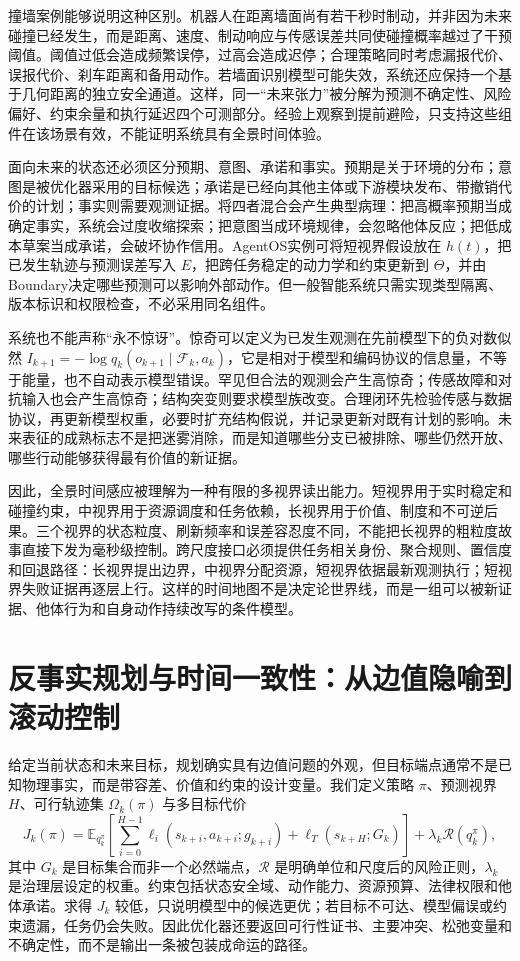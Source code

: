 撞墙案例能够说明这种区别。机器人在距离墙面尚有若干秒时制动，并非因为未来碰撞已经发生，而是距离、速度、制动响应与传感误差共同使碰撞概率越过了干预阈值。阈值过低会造成频繁误停，过高会造成迟停；合理策略同时考虑漏报代价、误报代价、刹车距离和备用动作。若墙面识别模型可能失效，系统还应保持一个基于几何距离的独立安全通道。这样，同一“未来张力”被分解为预测不确定性、风险偏好、约束余量和执行延迟四个可测部分。经验上观察到提前避险，只支持这些组件在该场景有效，不能证明系统具有全景时间体验。

面向未来的状态还必须区分预期、意图、承诺和事实。预期是关于环境的分布；意图是被优化器采用的目标候选；承诺是已经向其他主体或下游模块发布、带撤销代价的计划；事实则需要观测证据。将四者混合会产生典型病理：把高概率预期当成确定事实，系统会过度收缩探索；把意图当成环境规律，会忽略他体反应；把低成本草案当成承诺，会破坏协作信用。AgentOS实例可将短视界假设放在 $h(t)$，把已发生轨迹与预测误差写入 $E$，把跨任务稳定的动力学和约束更新到 $\Theta$，并由Boundary决定哪些预测可以影响外部动作。但一般智能系统只需实现类型隔离、版本标识和权限检查，不必采用同名组件。

系统也不能声称“永不惊讶”。惊奇可以定义为已发生观测在先前模型下的负对数似然 $I_{k+1}=-\log q_k(o_{k+1}\mid\mathcal{F}_k,a_k)$，它是相对于模型和编码协议的信息量，不等于能量，也不自动表示模型错误。罕见但合法的观测会产生高惊奇；传感故障和对抗输入也会产生高惊奇；结构突变则要求模型族改变。合理闭环先检验传感与数据协议，再更新模型权重，必要时扩充结构假说，并记录更新对既有计划的影响。未来表征的成熟标志不是把迷雾消除，而是知道哪些分支已被排除、哪些仍然开放、哪些行动能够获得最有价值的新证据。

因此，全景时间感应被理解为一种有限的多视界读出能力。短视界用于实时稳定和碰撞约束，中视界用于资源调度和任务依赖，长视界用于价值、制度和不可逆后果。三个视界的状态粒度、刷新频率和误差容忍度不同，不能把长视界的粗粒度故事直接下发为毫秒级控制。跨尺度接口必须提供任务相关身份、聚合规则、置信度和回退路径：长视界提出边界，中视界分配资源，短视界依据最新观测执行；短视界失败证据再逐层上行。这样的时间地图不是决定论世界线，而是一组可以被新证据、他体行为和自身动作持续改写的条件模型。

\section{反事实规划与时间一致性：从边值隐喻到滚动控制}

给定当前状态和未来目标，规划确实具有边值问题的外观，但目标端点通常不是已知物理事实，而是带容差、价值和约束的设计变量。我们定义策略 $\pi$、预测视界 $H$、可行轨迹集 $\Omega_k(\pi)$ 与多目标代价
\[
J_k(\pi)=\mathbb{E}_{q_k^\pi}\!\left[
\sum_{i=0}^{H-1}\ell_i(s_{k+i},a_{k+i};g_{k+i})
+\ell_T(s_{k+H};G_k)
\right]+\lambda_k\mathcal{R}(q_k^\pi),
\]
其中 $G_k$ 是目标集合而非一个必然端点，$\mathcal{R}$ 是明确单位和尺度后的风险正则，$\lambda_k$ 是治理层设定的权重。约束包括状态安全域、动作能力、资源预算、法律权限和他体承诺。求得 $J_k$ 较低，只说明模型中的候选更优；若目标不可达、模型偏误或约束遗漏，任务仍会失败。因此优化器还要返回可行性证书、主要冲突、松弛变量和不确定性，而不是输出一条被包装成命运的路径。

